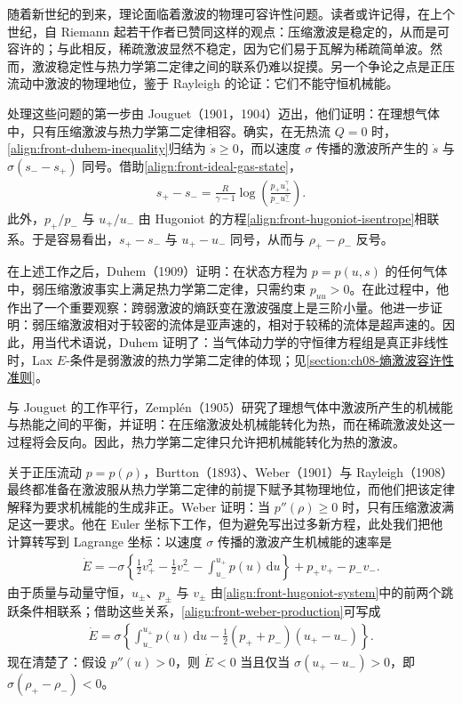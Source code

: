 \documentclass[../../main.tex]{subfiles}
\begin{document}
随着新世纪的到来，理论面临着激波的物理可容许性问题。读者或许记得，在上个世纪，自 Riemann 起若干作者已赞同这样的观点：压缩激波是稳定的，从而是可容许的；与此相反，稀疏激波显然不稳定，因为它们易于瓦解为稀疏简单波。然而，激波稳定性与热力学第二定律之间的联系仍难以捉摸。另一个争论之点是正压流动中激波的物理地位，鉴于 Rayleigh 的论证：它们不能守恒机械能。

处理这些问题的第一步由 Jouguet（1901，1904）迈出，他们证明：在理想气体中，只有压缩激波与热力学第二定律相容。确实，在无热流 $Q=0$ 时，\eqref{align:front-duhem-inequality}归结为 $\dot{s}\geqslant0$，而以速度 $\sigma$ 传播的激波所产生的 $\dot{s}$ 与 $\sigma(s_--s_+)$ 同号。借助\eqref{align:front-ideal-gas-state}，
\begin{align}
s_+-s_-=\frac{R}{\gamma-1}\log\left(\frac{p_+u_+^{\gamma}}{p_-u_-^{\gamma}}\right).\label{align:front-entropy-jump}
\end{align}
此外，$p_+/p_-$ 与 $u_+/u_-$ 由 Hugoniot 的方程\eqref{align:front-hugoniot-isentrope}相联系。于是容易看出，$s_+-s_-$ 与 $u_+-u_-$ 同号，从而与 $\rho_+-\rho_-$ 反号。

在上述工作之后，Duhem（1909）证明：在状态方程为 $p=p(u,s)$ 的任何气体中，弱压缩激波事实上满足热力学第二定律，只需约束 $p_{uu}>0$。在此过程中，他作出了一个重要观察：跨弱激波的熵跃变在激波强度上是三阶小量。他进一步证明：弱压缩激波相对于较密的流体是亚声速的，相对于较稀的流体是超声速的。因此，用当代术语说，Duhem 证明了：当气体动力学的守恒律方程组是真正非线性时，Lax $E$-条件是弱激波的热力学第二定律的体现；见\cref{section:ch08-熵激波容许性准则}。

与 Jouguet 的工作平行，Zemplén（1905）研究了理想气体中激波所产生的机械能与热能之间的平衡，并证明：在压缩激波处机械能转化为热，而在稀疏激波处这一过程将会反向。因此，热力学第二定律只允许把机械能转化为热的激波。

关于正压流动 $p=p(\rho)$，Burtton（1893）、Weber（1901）与 Rayleigh（1908）最终都准备在激波服从热力学第二定律的前提下赋予其物理地位，而他们把该定律解释为要求机械能的生成非正。Weber 证明：当 $p''(\rho)\geqslant0$ 时，只有压缩激波满足这一要求。他在 Euler 坐标下工作，但为避免写出过多新方程，此处我们把他计算转写到 Lagrange 坐标：以速度 $\sigma$ 传播的激波产生机械能的速率是
\begin{align}
\dot{E}=-\sigma\left\{\frac{1}{2}v_+^{2}-\frac{1}{2}v_-^{2}-\int_{u_-}^{u_+}p(u)\,\mathrm{d}u\right\}+p_+v_+-p_-v_-.\label{align:front-weber-production}
\end{align}
由于质量与动量守恒，$u_\pm$、$p_\pm$ 与 $v_\pm$ 由\eqref{align:front-hugoniot-system}中的前两个跳跃条件相联系；借助这些关系，\eqref{align:front-weber-production}可写成
\begin{align}
\dot{E}=\sigma\left\{\int_{u_-}^{u_+}p(u)\,\mathrm{d}u-\frac{1}{2}(p_++p_-)(u_+-u_-)\right\}.\label{align:front-weber-energy}
\end{align}
现在清楚了：假设 $p''(u)>0$，则 $\dot{E}<0$ 当且仅当 $\sigma(u_+-u_-)>0$，即 $\sigma(\rho_+-\rho_-)<0$。
\end{document}
